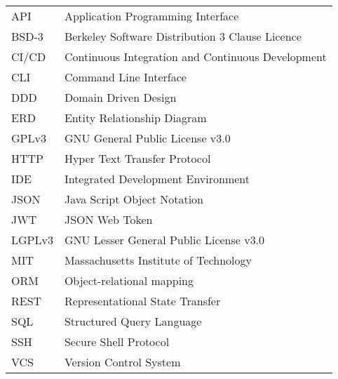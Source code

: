 \begin{longtable}{p{3cm}p{10cm}}
    API&Application Programming Interface\\
    BSD-3&Berkeley Software Distribution 3 Clause Licence\\
    CI/CD&Continuous Integration and Continuous Development\\
    CLI&Command Line Interface\\
    DDD&Domain Driven Design\\
    ERD&Entity Relationship Diagram\\
    GPLv3&GNU General Public License v3.0\\
    HTTP&Hyper Text Transfer Protocol\\
    IDE&Integrated Development Environment\\
    JSON&Java Script Object Notation\\
    JWT&JSON Web Token\\
    LGPLv3&GNU Lesser General Public License v3.0\\
    MIT&Massachusetts Institute of Technology\\
    ORM&Object-relational mapping\\
    REST&Representational State Transfer\\
    SQL&Structured Query Language\\
    SSH&Secure Shell Protocol\\
    VCS&Version Control System\\
\end{longtable}
\addtocounter{table}{-1}
